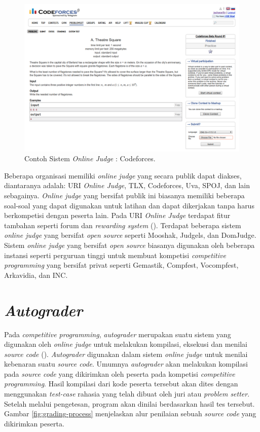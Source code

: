 \begin{figure}
	\centering
	\includegraphics[width=\textwidth]{images/codeforces}
	\caption{Contoh Sistem \textit{Online Judge} : Codeforces.}
	\label{fig:codeforces}
\end{figure}

\par Beberapa organisasi memiliki \textit{online judge} yang secara publik dapat diakses, diantaranya adalah: URI \textit{Online Judge}, TLX, Codeforces, Uva, SPOJ, dan lain sebagainya. \textit{Online judge} yang bersifat publik ini biasanya memiliki beberapa soal-soal yang dapat digunakan untuk latihan dan dapat dikerjakan tanpa harus berkompetisi dengan peserta lain. Pada URI \textit{Online Judge} terdapat fitur tambahan seperti forum dan \textit{rewarding system} (\cite{uriojpaper}). Terdapat beberapa sistem \textit{online judge} yang bersifat \textit{open source} seperti Mooshak, Judgels, dan DomJudge. Sistem \textit{online judge} yang bersifat \textit{open source} biasanya digunakan oleh beberapa instansi seperti perguruan tinggi untuk membuat kompetisi \textit{competitive programming} yang bersifat privat seperti Gemastik, Compfest, Vocompfest, Arkavidia, dan INC.

\section{\textit{Autograder}}

\par Pada \textit{competitive programming}, \textit{autograder} merupakan suatu sistem yang digunakan oleh \textit{online judge} untuk melakukan kompilasi, eksekusi dan menilai \textit{source code} (\cite{danutamalms}). \textit{Autograder} digunakan dalam sistem \textit{online judge} untuk menilai kebenaran suatu \textit{source code}. Umumnya \textit{autograder} akan melakukan kompilasi pada \textit{source code} yang dikirimkan oleh peserta pada kompetisi \textit{competitive programming}. Hasil kompilasi dari kode peserta tersebut akan dites dengan menggunakan \textit{test-case} rahasia yang telah dibuat oleh juri atau \textit{problem setter}. Setelah melalui pengetesan, program akan dinilai berdasarkan hasil tes tersebut. Gambar \ref{fig:grading-process} menjelaskan alur penilaian sebuah \textit{source code} yang dikirimkan peserta.

